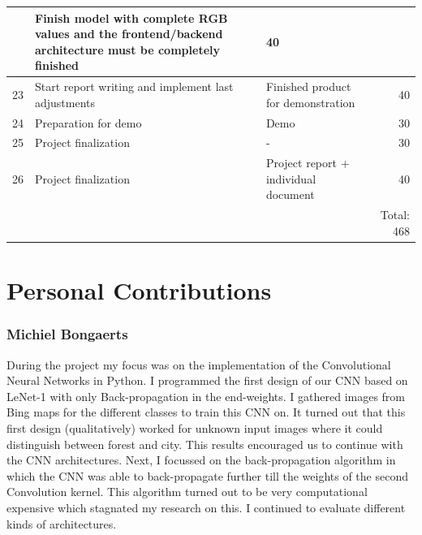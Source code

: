 \documentclass[a4paper,onecolumn]{report}
\begin{document}
\begin{center}
\begin{tabular}{| l | p{5cm}| p{5cm} | r | }
\begin{itemize}
	\end{itemize} & Finish model with complete RGB values and the frontend/backend architecture must be completely finished & 40 					\\  \hline
	23 & Start report writing and implement last adjustments & Finished product for demonstration & 40 	\\	\hline
	24 & Preparation for demo & Demo & 30				\\  \hline
    25 & Project finalization & - & 30 				\\ \hline
    26 & Project finalization & Project report + individual document & 40 \\ \hline
       & & & Total: 468  \\ \hline

    \hline
  \end{tabular}
\end{center}

\chapter{Personal Contributions}

\subsection{Michiel Bongaerts}
During the project my focus was on the implementation of the Convolutional Neural Networks in Python. I programmed the first design of our CNN based on LeNet-1 with only Back-propagation in the end-weights. I gathered images from Bing maps for the different classes to train this CNN on. It turned out that this first design (qualitatively) worked for unknown input images where it could distinguish between forest and city. This results encouraged us to continue with the CNN architectures. Next, I focussed on the back-propagation algorithm in which the CNN was able to back-propagate further till the weights of the second Convolution kernel. This algorithm turned out to be very computational expensive which stagnated my research on this. I continued to evaluate different kinds of architectures. 


{}

\end{document}
